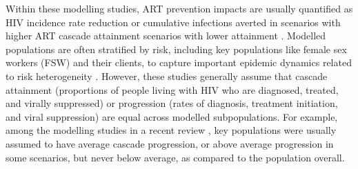 \par
Within these modelling studies, ART prevention impacts are usually quantified as
HIV incidence rate reduction or cumulative infections averted in
scenarios with higher ART cascade attainment \vs
scenarios with lower attainment \cite{Knight2022sr}.
Modelled populations are often stratified by risk,
including key populations like female sex workers (FSW) and their clients,
to capture important epidemic dynamics related to risk heterogeneity
\cite{Stigum1994,Garnett1996,Watts2010}.
However, these studies generally assume that cascade
attainment (\ie proportions of people living with HIV who are diagnosed, treated, and virally suppressed) or
progression (\ie rates of diagnosis, treatment initiation, and viral suppression)
are equal across modelled subpopulations.
For example, among the modelling studies in a recent review \cite{Knight2022sr},
key populations were usually assumed to have average cascade progression,
or above average progression in some scenarios, but never below average,
as compared to the population overall.
